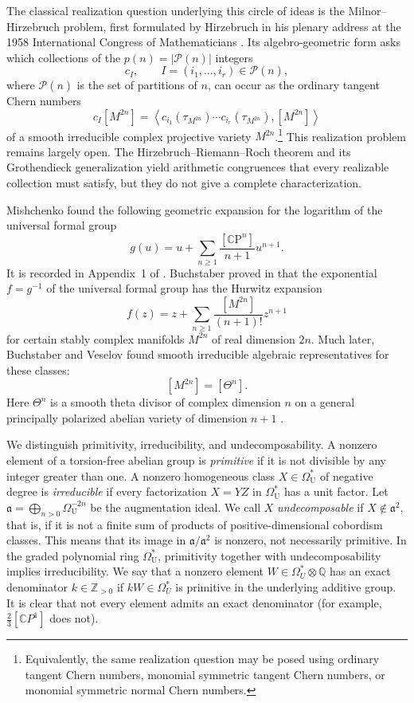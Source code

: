\documentclass[14pt,dvipsnames]{extarticle}
\numberwithin{equation}{subsection}
\theoremstyle{plain}
\theoremstyle{definition}
\theoremstyle{definition}
\newcommand{\OmU}{\Omega_{\mathrm U}^{\ast}}
\newcommand{\CP}{\mathbb{C}\mathrm P}
\newcommand{\Uu}{\mathrm{U}}
\begin{document}
The classical realization question underlying this circle of ideas is the
Milnor--Hirzebruch problem, first formulated by Hirzebruch in his plenary
address at the 1958 International Congress of Mathematicians
\cite{Hir58}. Its algebro-geometric form asks which collections of the
$p(n)=|\mathcal P(n)|$ integers
\[
 c_I,\qquad I=(i_1,\ldots,i_r)\in\mathcal P(n),
\]
where $\mathcal P(n)$ is the set of partitions of $n$, can occur as the
ordinary tangent Chern numbers
\[
 c_I[M^{2n}]
 =\left\langle c_{i_1}(\tau_{M^{2n}})\cdots c_{i_r}(\tau_{M^{2n}}),[M^{2n}]\right\rangle
\]
of a smooth irreducible complex projective variety $M^{2n}$.\footnote{Equivalently,
the same realization question may be posed using ordinary tangent Chern
numbers, monomial symmetric tangent Chern numbers, or monomial symmetric
normal Chern numbers.} This realization problem remains largely
open. The Hirzebruch--Riemann--Roch theorem and its Grothendieck
generalization yield arithmetic congruences that every realizable collection
must satisfy, but they do not give a complete characterization.

Mishchenko found the following geometric expansion for the logarithm
of the universal formal group
\begin{equation}\label{eq:intro-mishchenko}
 g(u)=u+\sum_{n\geq1}\frac{[\CP^n]}{n+1}u^{n+1}.
\end{equation}
It is recorded in Appendix~1 of \cite{Nov67}. Buchstaber proved in
\cite[Theorem~2.3]{Buc70} that the exponential $f=g^{-1}$ of the universal formal group
has the Hurwitz expansion
\begin{equation}\label{eq:intro-theta-exponential}
 f(z)=z+\sum_{n\geq1}\frac{[M^{2n}]}{(n+1)!}z^{n+1}
\end{equation}
for certain stably complex manifolds $M^{2n}$ of real dimension $2n$.
Much later, Buchstaber and Veselov found smooth irreducible algebraic
representatives for these classes:
\[
 [M^{2n}]=[\Theta^n].
\]
Here \(\Theta^n\) is a smooth theta divisor of complex dimension \(n\) on a
general principally polarized abelian variety of dimension \(n+1\)
\cite[Theorem~1.1]{BV24}.

We distinguish primitivity, irreducibility, and undecomposability. A nonzero
element of a torsion-free abelian group is \emph{primitive} if it is not
divisible by any integer greater than one. A nonzero homogeneous class
$X\in\OmU$ of negative degree is \emph{irreducible} if
every factorization $X=YZ$ in $\OmU$ has a unit factor. Let
$\mathfrak a=\bigoplus_{n>0}\Omega_{\Uu}^{-2n}$ be the augmentation ideal.
We call $X$ \emph{undecomposable} if $X\notin\mathfrak a^2$, that is, if it is
not a finite sum of products of positive-dimensional cobordism classes. This
means that its image in $\mathfrak a/\mathfrak a^2$ is nonzero, not necessarily
primitive. In the graded polynomial ring $\OmU$, primitivity together with
undecomposability implies irreducibility. We say that a nonzero element \(W\in\Omega_U^*\otimes\mathbb Q\) has an exact denominator \(k\in\mathbb Z_{>0}\) if \(kW\in\Omega_U^*\) is primitive in the underlying additive group. It is clear that not every element admits an exact denominator (for example, \(\frac23[\mathbb CP^1]\) does not).
\end{document}
